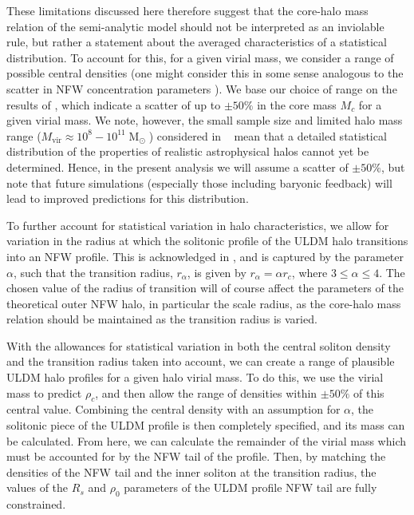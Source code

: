 \documentclass{pasa}%
\begin{document}
These limitations discussed here therefore suggest that the core-halo mass relation of the semi-analytic model should not be interpreted as an inviolable rule, but rather a statement about the averaged characteristics of a statistical distribution. To account for this, for a given virial mass, we consider a range of possible central densities (one might consider this in some sense analogous to the scatter in NFW concentration parameters \cite{Maccio:2008pcd}). We base our choice of range on the results of \cite{Schive:2014hza}, which indicate a scatter of up to $\pm 50\%$ in the core mass $M_c$ for a given virial mass. We note, however, the small sample size and limited halo mass range ($ M_{\mathrm{vir}} \approx 10^8-10^{11} \operatorname{M}_{\odot}$) considered in ~\cite{Schive:2014hza}  mean that a detailed statistical distribution of the properties of realistic astrophysical halos cannot yet be determined. Hence, in the present analysis we will assume a scatter of $\pm 50\%$, but note that future simulations (especially those including baryonic feedback) will lead to improved predictions for this distribution. 

To further account for statistical variation in halo characteristics, we allow for variation in the radius at which the solitonic profile of the ULDM halo transitions into an NFW profile. This is acknowledged in \cite{Robles:2018fur}, and is captured by the parameter $\alpha$, such that the transition radius, $r_{\alpha}$, is given by $r_{\alpha} = \alpha r_c$, where $3 \leq \alpha \leq 4$. The chosen value of the radius of transition will of course affect the parameters of the theoretical outer NFW halo, in particular the scale radius, as the core-halo mass relation should be maintained as the transition radius is varied.

With the allowances for statistical variation in both the central soliton density and the transition radius taken into account, we can create a range of plausible ULDM halo profiles for a given halo virial mass. To do this, we use the virial mass to predict $\rho_c$, and then allow the range of densities within $\pm 50\% $ of this central value. Combining the central density with an assumption for $\alpha$, the solitonic piece of the ULDM profile is then completely specified, and its mass can be calculated. From here, we can calculate the remainder of the virial mass which must be accounted for by the NFW tail of the profile. Then, by matching the densities of the NFW tail and the inner soliton at the transition radius, the values of the $R_s$ and $\rho_0$ parameters of the ULDM profile NFW tail are fully constrained.  
\end{document}
